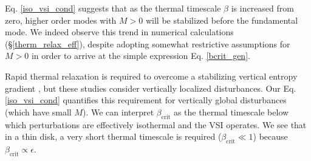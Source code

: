 Eq. \ref{iso_vsi_cond} suggests that as the thermal timescale $\beta$
is increased from zero, higher order modes with $M>0$
will be stabilized before the fundamental mode. We indeed observe this
trend in numerical calculations (\S\ref{therm_relax_eff}), despite
adopting somewhat restrictive assumptions for $M>0$ in order to arrive
at the simple expression Eq. \ref{bcrit_gen}. 

Rapid thermal relaxation is required to overcome a stabilizing
vertical entropy gradient \citep{goldreich67,urpin98,urpin03}, but these
studies consider vertically localized disturbances. Our 
Eq. \ref{iso_vsi_cond} quantifies this requirement for vertically
global disturbances (which have small $M$).  We can interpret
$\beta_\mathrm{crit}$ as the thermal timescale below which
perturbations are effectively isothermal and the VSI operates.  We see
that in a thin disk, a very short thermal timescale is required
($\beta_\mathrm{crit}\ll 1$) because $\beta_\mathrm{crit}\propto \epsilon$. 






